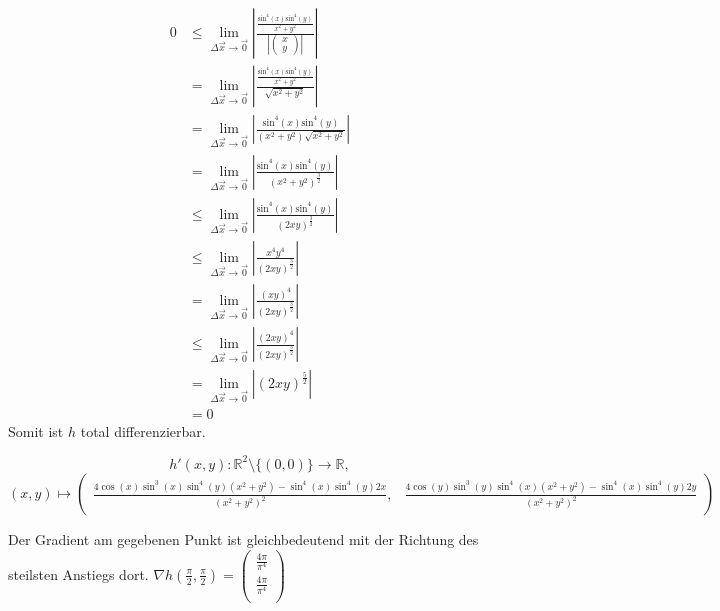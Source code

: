 \documentclass[10pt,a4paper,parskip=half]{scrartcl}
\newcommand{\vectwo}[2]{\left(\begin {array} {c}#1\\#2\\\end {array} \right)}
\begin{document}
\begin{enumerate}[(i)]
\begin{align*}
0 &\le\lim_{\Delta \vec x \to \vec 0} \left|\frac{\frac{\text{sin}^4(x)\text{sin}^4(y)}{x^2 + y^2}}{\left|\begin{pmatrix}x\\y\end{pmatrix} \right|}\right| \\
&= \lim_{\Delta \vec x \to \vec 0} \left|\frac{\frac{\text{sin}^4(x)\text{sin}^4(y)}{x^2 + y^2}}{\sqrt{x^2+y^2}}\right| \\
&= \lim_{\Delta \vec x \to \vec 0} \left|\frac{\text{sin}^4(x)\text{sin}^4(y)}{(x^2 + y^2)\sqrt{x^2+y^2}}\right| \\
&= \lim_{\Delta \vec x \to \vec 0} \left|\frac{\text{sin}^4(x)\text{sin}^4(y)}{(x^2 + y^2)^{\frac{3}{2}}}\right| \\
&\le \lim_{\Delta \vec x \to \vec 0} \left|\frac{\text{sin}^4(x)\text{sin}^4(y)}{(2xy)^{\frac{3}{2}}}\right| \\
&\le \lim_{\Delta \vec x \to \vec 0} \left|\frac{x^4y^4}{(2xy)^{\frac{3}{2}}}\right| \\
&= \lim_{\Delta \vec x \to \vec 0} \left|\frac{(xy)^4}{(2xy)^{\frac{3}{2}}}\right| \\
&\le \lim_{\Delta \vec x \to \vec 0} \left|\frac{(2xy)^4}{(2xy)^{\frac{3}{2}}}\right| \\
&= \lim_{\Delta \vec x \to \vec 0} \left|(2xy)^{\frac{5}{2}}\right| \\
&= 0
\end{align*}
Somit ist $h$ total differenzierbar.

\[
h'(x,y): \mathbb{R}^2\setminus{\{(0,0)\}} \to \mathbb{R}, 
\]
\[
(x,y) \mapsto \left( \begin{array}{cc} 
\frac{4\cos(x)\sin^3(x)\sin^4(y)(x^2 + y^2) - \sin^4(x)\sin^4(y)2x}{(x^2 + y^2)^2}, &
\frac{4\cos(y)\sin^3(y)\sin^4(x)(x^2 + y^2) - \sin^4(x)\sin^4(y)2y}{(x^2 + y^2)^2}
\end{array}\right)
\]

Der Gradient am gegebenen Punkt ist gleichbedeutend mit der Richtung des steilsten Anstiegs dort. \(\nabla h(\frac{\pi}{2},\frac{\pi}{2}) = \vectwo{\frac{4\pi}{\pi^4}}{\frac{4\pi}{\pi^4}}\) 


\end{enumerate}
\end{document}
